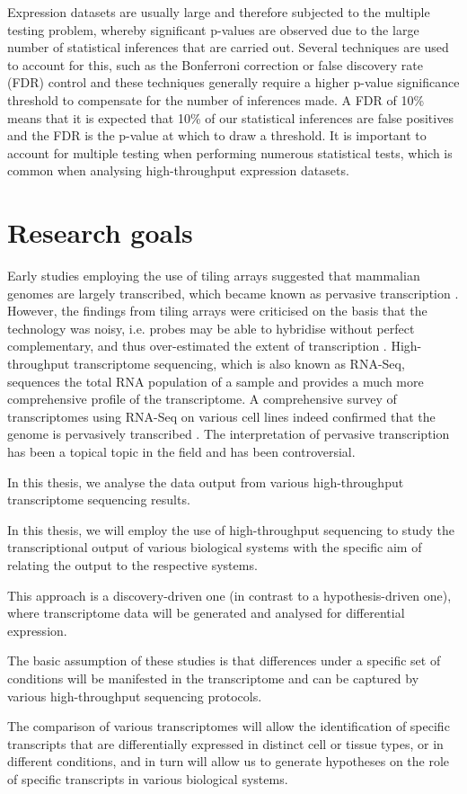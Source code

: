 Expression datasets are usually large and therefore subjected to the multiple testing problem, whereby significant p-values are observed due to the large number of statistical inferences that are carried out. Several techniques are used to account for this, such as the Bonferroni correction or false discovery rate (FDR) control \citep{fdr_paper} and these techniques generally require a higher p-value significance threshold to compensate for the number of inferences made. A FDR of 10\% means that it is expected that 10\% of our statistical inferences are false positives and the FDR is the p-value at which to draw a threshold. It is important to account for multiple testing when performing numerous statistical tests, which is common when analysing high-throughput expression datasets.

\section{Research goals}

Early studies employing the use of tiling arrays suggested that mammalian genomes are largely transcribed, which became known as pervasive transcription \citep{pmid17510325}. However, the findings from tiling arrays were criticised on the basis that the technology was noisy, i.e. probes may be able to hybridise without perfect complementary, and thus over-estimated the extent of transcription \citep{pmid20502517}. High-throughput transcriptome sequencing, which is also known as RNA-Seq, sequences the total RNA population of a sample and provides a much more comprehensive profile of the transcriptome. A comprehensive survey of transcriptomes using RNA-Seq on various cell lines indeed confirmed that the genome is pervasively transcribed \citep{pmid22955620}. The interpretation of pervasive transcription has been a topical topic in the field and has been controversial.

In this thesis, we analyse the data output from various high-throughput transcriptome sequencing results.

In this thesis, we will employ the use of high-throughput sequencing to study the transcriptional output of various biological systems with the specific aim of relating the output to the respective systems.

This approach is a discovery-driven one (in contrast to a hypothesis-driven one), where transcriptome data will be generated and analysed for differential expression.

The basic assumption of these studies is that differences under a specific set of conditions will be manifested in the transcriptome and can be captured by various high-throughput sequencing protocols.

The comparison of various transcriptomes will allow the identification of specific transcripts that are differentially expressed in distinct cell or tissue types, or in different conditions, and in turn will allow us to generate hypotheses on the role of specific transcripts in various biological systems.



